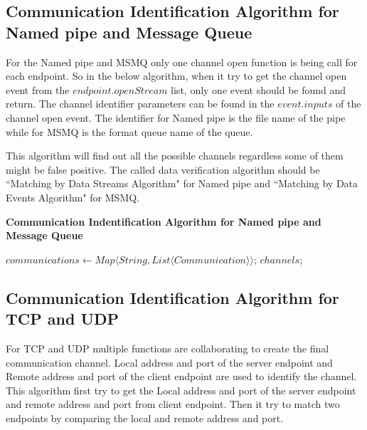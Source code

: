 \subsection{Communication Identification Algorithm for Named pipe and Message Queue}
For the Named pipe and MSMQ only one channel open function is being call for each endpoint. So in the below algorithm, when it try to get the channel open event from the $endpoint.openStream$ list, only one event should be found and return. The channel identifier parameters can be found in the $event.inputs$ of the channel open event. The identifier for Named pipe is the file name of the pipe while for MSMQ is the format queue name of the queue. 

This algorithm will find out all the possible channels regardless some of them might be false positive. The called data verification algorithm should be ``Matching by Data Streams Algorithm" for Named pipe and ``Matching by Data Events Algorithm" for MSMQ.

\begin{algorithm}[H]
\DontPrintSemicolon
\caption{{\bf Communication Indentification Algorithm for Named pipe and Message Queue} \label{channelAlg1}}
$communications \leftarrow Map \langle String, List \langle Communication \rangle \rangle$;\; 
\KwRet $channels$;\;
\end{algorithm} 


\subsection{Communication Identification Algorithm for TCP and UDP}
For TCP and UDP multiple functions are collaborating to create the final communication channel. Local address and port of the server endpoint and Remote address and port of the client endpoint are used to identify the channel. This algorithm first try to get the Local address and port of the server endpoint and remote address and port from client endpoint. Then it try to match two endpoints by comparing the local and remote address and port.

